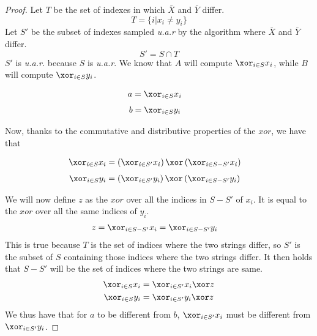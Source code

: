 \begin{proof}
    Let $T$ be the set of indexes in which $\bar{X}$ and $\bar{Y}$ differ.
    \[
        T = \{ i | x_i \neq y_i\} 
    \]
    Let $S'$ be the subset of indexes sampled \emph{u.a.r} by the algorithm where $\bar{X}$ and $\bar{Y}$ differ.
    \[
        S' = S \cap T 
    \]
    $S'$ is \emph{u.a.r.} because $S$ is \emph{u.a.r}. We know that $A$ will compute $\xor_{i \in S} x_i$, while $B$ will compute $\xor_{i \in S} y_i$.
    \begin{multicols}{2}
    \noindent
        \begin{align}
            a &= \xor_{i \in S} x_i
        \end{align}
        \begin{align}
            b &= \xor_{i \in S} y_i 
        \end{align}
    \end{multicols}
    Now, thanks to the commutative and distributive properties of the $xor$, we have that
    \begin{multicols}{2}   
    \noindent
        \begin{align}
            \xor_{i \in S} x_i &= \left( \xor_{i \in S'} x_i \right) \xor \left( \xor_{i \in S-S'} x_i \right)
        \end{align}
        \begin{align}
            \xor_{i \in S} y_i &= \left( \xor_{i \in S'} y_i \right) \xor \left( \xor_{i \in S-S'} y_i \right)
        \end{align}
    \end{multicols}
    We will now define $z$ as the $xor$ over all the indices in $S-S'$ of $x_i$. It is equal to the $xor$ over all the same indices of $y_i$.
    \begin{align}        
        z = \xor_{i \in S-S'} x_i &= \xor_{i \in S-S'} y_i
    \end{align}
    This is true because $T$ is the set of indices where the two strings differ, so $S'$ is the subset of $S$ containing those indices where the two strings differ. It then holds that $S-S'$ will be the set of indices where the two strings are same. 
    \begin{align}
        \xor_{i \in S} x_i &= \xor_{i \in S'} x_i \xor z \\
        \xor_{i \in S} y_i &= \xor_{i \in S'} y_i \xor z
    \end{align}
    We thus have that for $a$ to be different from $b$, $\xor_{i \in S'} x_i$ must be different from $\xor_{i \in S'} y_i $.

\end{proof}
